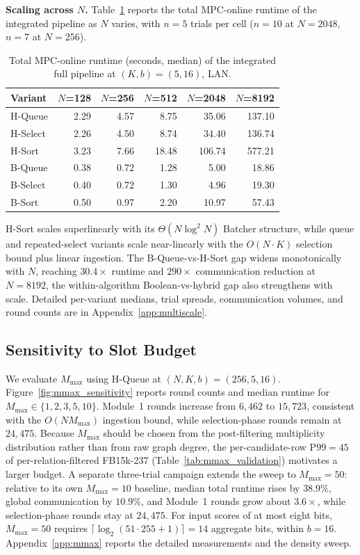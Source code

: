 \documentclass[conference,compsoc,letterpaper]{IEEEtran}
\theoremstyle{definition}
\theoremstyle{remark}
\newcommand{\Mmax}{M_{\max}}
\newcommand{\scorebits}{b}
\newcommand{\HSort}{H-Sort}
\newcommand{\HQueue}{H-Queue}
\newcommand{\HSelect}{H-Select}
\newcommand{\BSort}{B-Sort}
\newcommand{\BQueue}{B-Queue}
\newcommand{\BSelect}{B-Select}
\begin{document}
\noindent\textbf{Scaling across $N$.}
Table~\ref{tab:multiscale} reports the total MPC-online runtime of the integrated pipeline as $N$ varies, with $n=5$ trials per cell ($n=10$ at $N=2048$, $n=7$ at $N=256$).
\begin{table}[t]
\centering
\small
\caption{Total MPC-online runtime (seconds, median) of the
integrated full pipeline at $(K,b)=(5,16)$, LAN. }
\label{tab:multiscale}
\begin{tabular}{@{}lrrrrr@{}}
\toprule
\textbf{Variant} & $N$=128 & $N$=256 & $N$=512 & $N$=2048 & $N$=8192 \\
\midrule
\HQueue{}  & 2.29 & 4.57 & 8.75  & 35.06   & 137.10 \\
\HSelect{} & 2.26 & 4.50 & 8.74  & 34.40   & 136.74 \\
\HSort{}   & 3.23 & 7.66 & 18.48 & 106.74  & 577.21 \\
\BQueue{}  & 0.38 & 0.72 & 1.28  & 5.00    & 18.86  \\
\BSelect{} & 0.40 & 0.72 & 1.30  & 4.96    & 19.30  \\
\BSort{}   & 0.50 & 0.97 & 2.20  & 10.97   & 57.43  \\
\bottomrule
\end{tabular}
\vspace{-3mm}
\end{table}
\HSort{} scales superlinearly with its $\Theta(N\log^2 N)$ Batcher structure, while queue and repeated-select variants scale near-linearly with the $O(N\cdot K)$ selection bound plus linear ingestion.
The \BQueue{}-vs-\HSort{} gap widens monotonically with $N$, reaching $30.4\times$ runtime and $290\times$ communication reduction at $N=8192$, the within-algorithm Boolean-vs-hybrid gap also strengthens with scale.
Detailed per-variant medians, trial spreads, communication volumes, and round counts are in Appendix~\ref{app:multiscale}.

\subsection{Sensitivity to Slot Budget}
\label{subsec:mmax}

We evaluate $\Mmax$ using \HQueue{} at $(N,K,\scorebits)=(256,5,16)$.
Figure~\ref{fig:mmax_sensitivity} reports round counts and median runtime for $\Mmax\in\{1,2,3,5,10\}$.
Module~1 rounds increase from $6{,}462$ to $15{,}723$, consistent with the $O(N\Mmax)$ ingestion bound, while selection-phase rounds remain at $24{,}475$.
Because $\Mmax$ should be chosen from the post-filtering multiplicity distribution rather than from raw graph degree, the per-candidate-row $\text{P99}=45$ of per-relation-filtered FB15k-237 (Table~\ref{tab:mmax_validation}) motivates a larger budget.
A separate three-trial campaign extends the sweep to $\Mmax=50$: relative to its own $\Mmax=10$ baseline, median total runtime rises by $38.9\%$, global communication by $10.9\%$, and Module~1 rounds grow about $3.6\times$, while selection-phase rounds stay at $24{,}475$.
For input scores of at most eight bits, $\Mmax=50$ requires $\lceil\log_2(51\cdot255+1)\rceil=14$ aggregate bits, within $\scorebits=16$.
Appendix~\ref{app:mmax} reports the detailed measurements and the density sweep.
\end{document}
